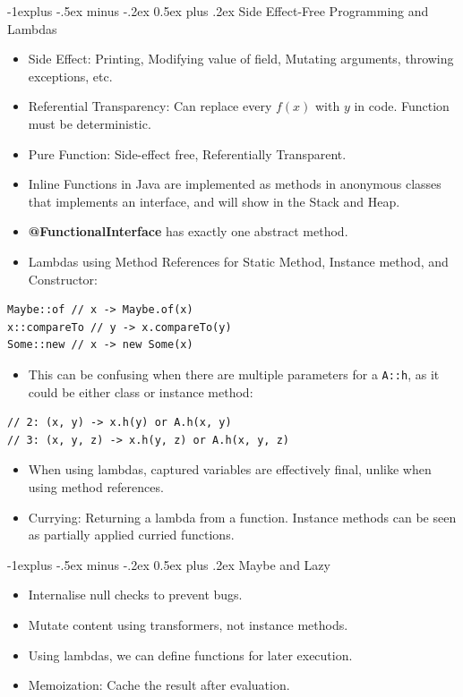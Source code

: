 \documentclass[10pt, landscape]{article}
\makeatletter
\renewcommand{\section}{\@startsection{section}{1}{0mm}%
                                {-1ex plus -.5ex minus -.2ex}%
                                {0.5ex plus .2ex}%
                                {\normalfont\large\bfseries}}
\renewcommand{\section}{\@startsection{section}{2}{0mm}%
                                {-1explus -.5ex minus -.2ex}%
                                {0.5ex plus .2ex}%
                                {\normalfont\normalsize\bfseries}}
\makeatother
\begin{document}
\begin{multicols*}{4}
\section{Side Effect-Free Programming and Lambdas}
\begin{itemize}
    \item Side Effect: Printing, Modifying value of field, Mutating arguments, throwing exceptions, etc.
    \item Referential Transparency: Can replace every $f(x)$ with $y$ in code. Function must be deterministic.
    \item Pure Function: Side-effect free, Referentially Transparent.
    \item Inline Functions in Java are implemented as methods in anonymous classes that implements an interface, and will show in the Stack and Heap.
    \item \textbf{@FunctionalInterface} has exactly one abstract method.
    \item Lambdas using Method References for Static Method, Instance method, and Constructor:
\end{itemize}
\begin{lstlisting}
Maybe::of // x -> Maybe.of(x)   
x::compareTo // y -> x.compareTo(y)
Some::new // x -> new Some(x)
\end{lstlisting}
\begin{itemize}
    \item This can be confusing when there are multiple parameters for a \verb|A::h|, as it could be either class or instance method:
\end{itemize}
\begin{lstlisting}
// 2: (x, y) -> x.h(y) or A.h(x, y)
// 3: (x, y, z) -> x.h(y, z) or A.h(x, y, z)
\end{lstlisting}
\begin{itemize}
    \item When using lambdas, captured variables are effectively final, unlike when using method references.
    \item Currying: Returning a lambda from a function. Instance methods can be seen as partially applied curried functions.
\end{itemize}

\section{Maybe and Lazy}
\begin{itemize}
    \item Internalise null checks to prevent bugs.
    \item Mutate content using transformers, not instance methods.
    \item Using lambdas, we can define functions for later execution.
    \item Memoization: Cache the result after evaluation.
\end{itemize}


\end{multicols*}
\end{document}
